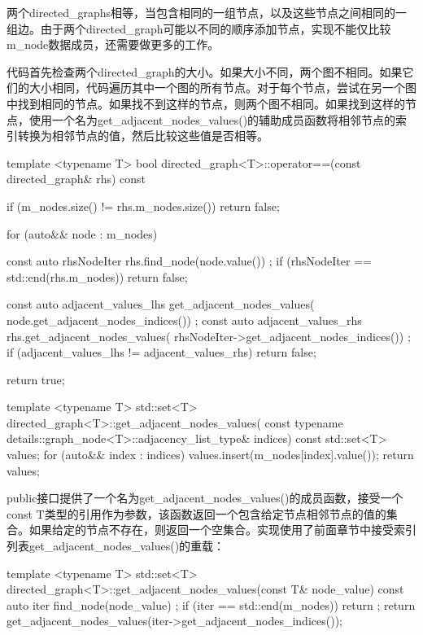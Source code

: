 两个directed\_graphs相等，当包含相同的一组节点，以及这些节点之间相同的一组边。由于两个directed\_graph可能以不同的顺序添加节点，实现不能仅比较m\_node数据成员，还需要做更多的工作。

代码首先检查两个directed\_graph的大小。如果大小不同，两个图不相同。如果它们的大小相同，代码遍历其中一个图的所有节点。对于每个节点，尝试在另一个图中找到相同的节点。如果找不到这样的节点，则两个图不相同。如果找到这样的节点，使用一个名为get\_adjacent\_nodes\_values()的辅助成员函数将相邻节点的索引转换为相邻节点的值，然后比较这些值是否相等。

\begin{cpp}
template <typename T>
bool directed_graph<T>::operator==(const directed_graph& rhs) const
{
    if (m_nodes.size() != rhs.m_nodes.size()) { return false; }

    for (auto&& node : m_nodes) {
        const auto rhsNodeIter { rhs.find_node(node.value()) };
        if (rhsNodeIter == std::end(rhs.m_nodes)) { return false; }

        const auto adjacent_values_lhs { get_adjacent_nodes_values(
            node.get_adjacent_nodes_indices()) };
        const auto adjacent_values_rhs { rhs.get_adjacent_nodes_values(
            rhsNodeIter->get_adjacent_nodes_indices()) };
        if (adjacent_values_lhs != adjacent_values_rhs) { return false; }
    }
    return true;
}

template <typename T>
std::set<T> directed_graph<T>::get_adjacent_nodes_values(
    const typename details::graph_node<T>::adjacency_list_type& indices) const
{
    std::set<T> values;
    for (auto&& index : indices) { values.insert(m_nodes[index].value()); }
    return values;
}
\end{cpp}


public接口提供了一个名为get\_adjacent\_nodes\_values()的成员函数，接受一个const T类型的引用作为参数，该函数返回一个包含给定节点相邻节点的值的集合。如果给定的节点不存在，则返回一个空集合。实现使用了前面章节中接受索引列表get\_adjacent\_nodes\_values()的重载：

\begin{cpp}
template <typename T>
std::set<T> directed_graph<T>::get_adjacent_nodes_values(const T& node_value) const
{
    auto iter { find_node(node_value) };
    if (iter == std::end(m_nodes)) { return {}; }
    return get_adjacent_nodes_values(iter->get_adjacent_nodes_indices());
}
\end{cpp}

